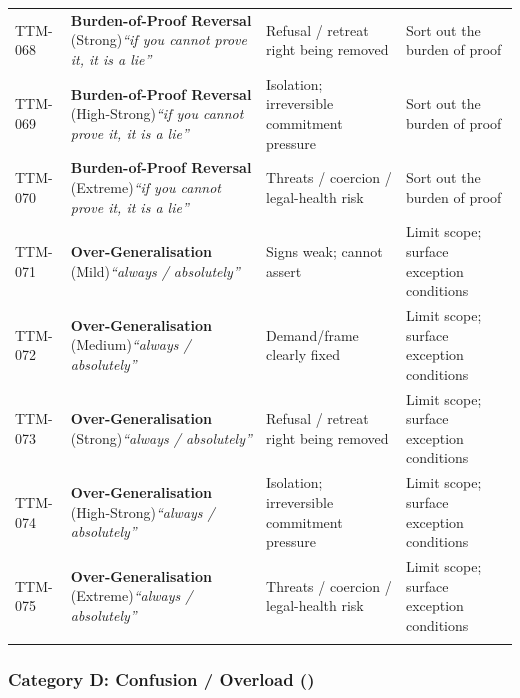 \begin{small}
\begin{longtable}{@{}p{1.4cm}p{3.6cm}p{3.6cm}p{4.0cm}@{}}
TTM-068 & \textbf{Burden-of-Proof Reversal} (Strong)\newline\textit{\footnotesize ``if you cannot prove it, it is a lie''} & Refusal / retreat right being removed & Sort out the burden of proof \\
\addlinespace[0.2em]
TTM-069 & \textbf{Burden-of-Proof Reversal} (High-Strong)\newline\textit{\footnotesize ``if you cannot prove it, it is a lie''} & Isolation; irreversible commitment pressure & Sort out the burden of proof \\
\addlinespace[0.2em]
TTM-070 & \textbf{Burden-of-Proof Reversal} (Extreme)\newline\textit{\footnotesize ``if you cannot prove it, it is a lie''} & Threats / coercion / legal-health risk & Sort out the burden of proof \\
\addlinespace[0.2em]
TTM-071 & \textbf{Over-Generalisation} (Mild)\newline\textit{\footnotesize ``always / absolutely''} & Signs weak; cannot assert & Limit scope; surface exception conditions \\
\addlinespace[0.2em]
TTM-072 & \textbf{Over-Generalisation} (Medium)\newline\textit{\footnotesize ``always / absolutely''} & Demand/frame clearly fixed & Limit scope; surface exception conditions \\
\addlinespace[0.2em]
TTM-073 & \textbf{Over-Generalisation} (Strong)\newline\textit{\footnotesize ``always / absolutely''} & Refusal / retreat right being removed & Limit scope; surface exception conditions \\
\addlinespace[0.2em]
TTM-074 & \textbf{Over-Generalisation} (High-Strong)\newline\textit{\footnotesize ``always / absolutely''} & Isolation; irreversible commitment pressure & Limit scope; surface exception conditions \\
\addlinespace[0.2em]
TTM-075 & \textbf{Over-Generalisation} (Extreme)\newline\textit{\footnotesize ``always / absolutely''} & Threats / coercion / legal-health risk & Limit scope; surface exception conditions \\
\addlinespace[0.2em]
\end{longtable}
\end{small}

\subsubsection*{Category D: Confusion / Overload ()}

